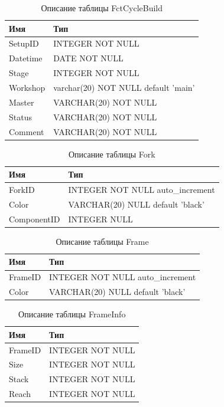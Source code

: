 \documentclass[a4paper,14pt]{extarticle}
\begin{document}
\begin{table}[h!] 
 \centering
	\caption{Описание таблицы FctCycleBuild}
	\begin{tabular}{|l|l|}
  \hline \textbf{Имя} & \textbf{Тип} \\
		\hline
		SetupID &       INTEGER NOT NULL \\ \hline
		Datetime &      DATE NOT NULL \\ \hline
		Stage & INTEGER NOT NULL \\ \hline
		Workshop &      varchar(20) NOT NULL default 'main' \\ \hline
		Master &        VARCHAR(20) NOT NULL \\ \hline
		Status &        VARCHAR(20) NOT NULL \\ \hline
		Comment &       VARCHAR(20) NOT NULL \\ \hline
	\end{tabular}
	\label{}
\end{table}


\begin{table}[h!] 
 \centering
	\caption{Описание таблицы Fork}
	\begin{tabular}{|l|l|}
  \hline \textbf{Имя} & \textbf{Тип} \\
		\hline
		ForkID &  INTEGER NOT NULL auto\_increment \\ \hline
		Color & VARCHAR(20) NULL default 'black' \\ \hline
		ComponentID &  INTEGER NULL \\ \hline
	\end{tabular}
	\label{ta:fork}
\end{table}



\begin{table}[h!] 
 \centering
	\caption{Описание таблицы Frame}
	\begin{tabular}{|l|l|}
  \hline \textbf{Имя} & \textbf{Тип} \\
		\hline
		FrameID &  INTEGER NOT NULL auto\_increment \\ \hline
		Color & VARCHAR(20) NULL default 'black' \\ \hline
	\end{tabular}
	\label{tab:frame}
\end{table}



\begin{table}[h!] 
 \centering
	\caption{Описание таблицы FrameInfo}
	\begin{tabular}{|l|l|}
  \hline \textbf{Имя} & \textbf{Тип} \\
		\hline
		FrameID &       INTEGER NOT NULL \\ \hline
		Size & INTEGER NOT NULL \\ \hline
		Stack & INTEGER NOT NULL \\ \hline
		Reach & INTEGER NOT NULL \\ \hline
	\end{tabular}
	\label{tab:frameinfo}
\end{table}
\end{document}
